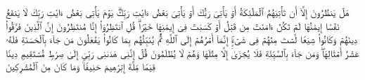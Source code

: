 هَلۡ یَنظُرُونَ إِلَّاۤ أَن تَأۡتِیَهُمُ ٱلۡمَلَٰۤئِكَةُ أَوۡ یَأۡتِیَ رَبُّكَ أَوۡ یَأۡتِیَ بَعۡضُ ءَایَٰتِ رَبِّكَۗ یَوۡمَ یَأۡتِی بَعۡضُ ءَایَٰتِ رَبِّكَ لَا یَنفَعُ نَفۡسًا إِیمَٰنُهَا لَمۡ تَكُنۡ ءَامَنَتۡ مِن قَبۡلُ أَوۡ كَسَبَتۡ فِیۤ إِیمَٰنِهَا خَیۡرࣰاۗ قُلِ ٱنتَظِرُوۤا۟ إِنَّا مُنتَظِرُونَ%
\stopbuffer%
\startbuffer[\q:6:159]
إِنَّ ٱلَّذِینَ فَرَّقُوا۟ دِینَهُمۡ وَكَانُوا۟ شِیَعࣰا لَّسۡتَ مِنۡهُمۡ فِی شَیۡءٍۚ إِنَّمَاۤ أَمۡرُهُمۡ إِلَى ٱللَّهِ ثُمَّ یُنَبِّئُهُم بِمَا كَانُوا۟ یَفۡعَلُونَ%
\stopbuffer%
\startbuffer[\q:6:160]
مَن جَاۤءَ بِٱلۡحَسَنَةِ فَلَهُۥ عَشۡرُ أَمۡثَالِهَاۖ وَمَن جَاۤءَ بِٱلسَّیِّئَةِ فَلَا یُجۡزَىٰۤ إِلَّا مِثۡلَهَا وَهُمۡ لَا یُظۡلَمُونَ%
\stopbuffer%
\startbuffer[\q:6:161]
قُلۡ إِنَّنِی هَدَىٰنِی رَبِّیۤ إِلَىٰ صِرَٰطࣲ مُّسۡتَقِیمࣲ دِینࣰا قِیَمࣰا مِّلَّةَ إِبۡرَٰهِیمَ حَنِیفࣰاۚ وَمَا كَانَ مِنَ ٱلۡمُشۡرِكِینَ%
\stopbuffer%
